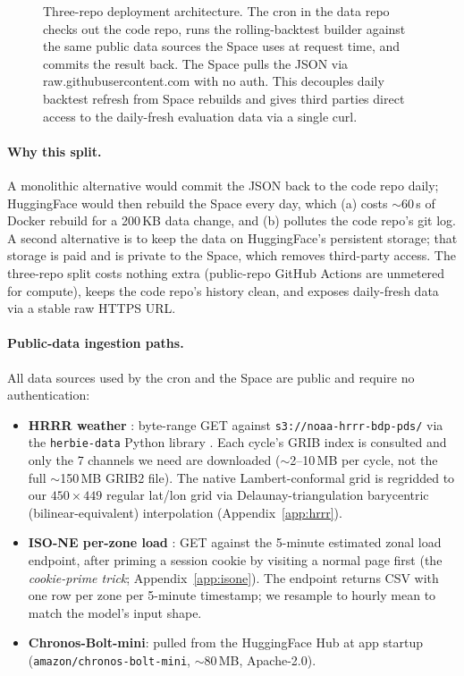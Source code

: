 \begin{figure}[H]
\centering

\caption{Three-repo deployment architecture. The cron in the data repo checks out the code repo, runs the rolling-backtest builder against the same public data sources the Space uses at request time, and commits the result back. The Space pulls the JSON via raw.githubusercontent.com with no auth. This decouples daily backtest refresh from Space rebuilds and gives third parties direct access to the daily-fresh evaluation data via a single curl.}
\label{fig:3repo}
\end{figure}

\paragraph{Why this split.}
A monolithic alternative would commit the JSON back to the code repo daily; HuggingFace would then rebuild the Space every day, which (a) costs $\sim$60\,s of Docker rebuild for a 200\,KB data change, and (b) pollutes the code repo's git log. A second alternative is to keep the data on HuggingFace's persistent storage; that storage is paid and is private to the Space, which removes third-party access. The three-repo split costs nothing extra (public-repo GitHub Actions are unmetered for compute), keeps the code repo's history clean, and exposes daily-fresh data via a stable raw HTTPS URL.

\paragraph{Public-data ingestion paths.}
All data sources used by the cron and the Space are public and require no authentication:

\begin{itemize}\setlength\itemsep{1pt}
  \item \textbf{HRRR weather} \citep{noaa2024hrrr,benjamin2016hrrr}: byte-range GET against \texttt{s3://noaa-hrrr-bdp-pds/} via the \texttt{herbie-data} Python library \citep{blaylock2023herbie}. Each cycle's GRIB index is consulted and only the 7 channels we need are downloaded ($\sim$2--10\,MB per cycle, not the full $\sim$150\,MB GRIB2 file). The native Lambert-conformal grid is regridded to our $450\times 449$ regular lat/lon grid via Delaunay-triangulation barycentric (bilinear-equivalent) interpolation (Appendix~\ref{app:hrrr}).
  \item \textbf{ISO-NE per-zone load} \citep{isone2024data}: GET against the 5-minute estimated zonal load endpoint, after priming a session cookie by visiting a normal page first (the \emph{cookie-prime trick}; Appendix~\ref{app:isone}). The endpoint returns CSV with one row per zone per 5-minute timestamp; we resample to hourly mean to match the model's input shape.
  \item \textbf{Chronos-Bolt-mini}: pulled from the HuggingFace Hub at app startup (\texttt{amazon/chronos-bolt-mini}, $\sim$80\,MB, Apache-2.0).
\end{itemize}

